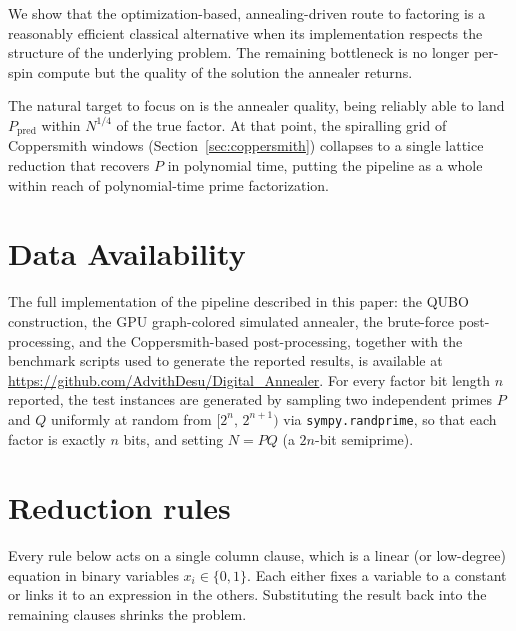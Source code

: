 \documentclass[reprint,twocolumn,amsmath,amssymb,nofootinbib]{revtex4-2}
\begin{document}
We show that the optimization-based, annealing-driven route to factoring is a reasonably efficient classical alternative when its implementation respects the structure of the underlying problem. The remaining bottleneck is no longer per-spin compute but the quality of the solution the annealer returns.

The natural target to focus on is the annealer quality, being reliably able to land $P_{\mathrm{pred}}$ within $N^{1/4}$ of the true factor. At that point, the spiralling grid of Coppersmith windows (Section~\ref{sec:coppersmith}) collapses to a single lattice reduction that recovers $P$ in polynomial time, putting the pipeline as a whole within reach of polynomial-time prime factorization.

\section*{Data Availability}

The full implementation of the pipeline described in this paper: the QUBO construction, the GPU graph-colored simulated annealer, the brute-force post-processing, and the Coppersmith-based post-processing, together with the benchmark scripts used to generate the reported results, is available at \url{https://github.com/AdvithDesu/Digital_Annealer}. For every factor bit length $n$ reported, the test instances are generated by sampling two independent primes $P$ and $Q$ uniformly at random from $[2^{n},\, 2^{n + 1})$ via \texttt{sympy.randprime}, so that each factor is exactly $n$ bits, and setting $N = PQ$ (a $2n$-bit semiprime).

\newpage




\appendix
\section{Reduction rules}\label{app:rules}

Every rule below acts on a single column clause, which is a linear (or low-degree) equation in binary variables $x_i \in \{0,1\}$. Each either fixes a variable to a constant or links it to an expression in the others. Substituting the result back into the remaining clauses shrinks the problem.
\end{document}
